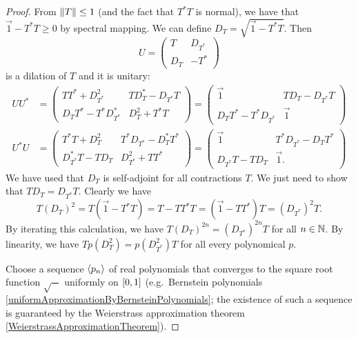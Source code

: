 \begin{proof}
From $\lVert T\rVert\leq 1$ (and the fact that $T^*T$ is normal), we have that $\vec{1}-T^*T\geq 0$ by spectral mapping. We can define $D_T = \sqrt{\vec{1}-T^*T}$. Then
\[ U = \begin{pmatrix}
T & D_{T^*} \\ D_T & -T^*
\end{pmatrix} \]
is a dilation of $T$ and it is unitary:
\begin{align*}
UU^* &= \begin{pmatrix}
TT^* + D_{T^*}^2 & TD_T^* - D_{T^*}T \\
D_TT^* - T^*D_{T^*}^* & D^2_{T} + T^*T
\end{pmatrix} = \begin{pmatrix}
\vec{1} & TD_T - D_{T^*}T \\
D_TT^* - T^*D_{T^*} & \vec{1}
\end{pmatrix} \\
U^*U &= \begin{pmatrix}
T^*T + D_{T}^2 & T^*D_{T^*} - D_{T}^*T^* \\
D_{T^*}^*T - TD_{T} & D^2_{T^*} + TT^*
\end{pmatrix} = \begin{pmatrix}
\vec{1} & T^*D_{T^*} - D_{T}T^* \\
D_{T^*}T - TD_{T} & \vec{1}.
\end{pmatrix}
\end{align*}
We have used that $D_T$ is self-adjoint for all contractions $T$. We just need to show that $TD_T = D_{T^*}T$. Clearly we have
\[ T(D_T)^2 = T(\vec{1} - T^*T) = T - TT^*T = (\vec{1} - TT^*)T = (D_{T^*})^2T. \]
By iterating this calculation, we have $T(D_T)^{2n} = (D_{T^*})^{2n}T$ for all $n\in \mathbb{N}$. By linearity, we have $Tp(D_T^2) = p(D_{T^*}^2)T$ for all every polynomical $p$.

Choose a sequence $\left\langle p_n \right\rangle$ of real polynomials that converges to the square root function $\sqrt{-}$ uniformly on $\interval{0,1}$ (e.g.\ Bernstein polynomials \ref{uniformApproximationByBernsteinPolynomials}; the existence of such a sequence is guaranteed by the Weierstrass approximation theorem \ref{WeierstrassApproximationTheorem}).


\end{proof}

